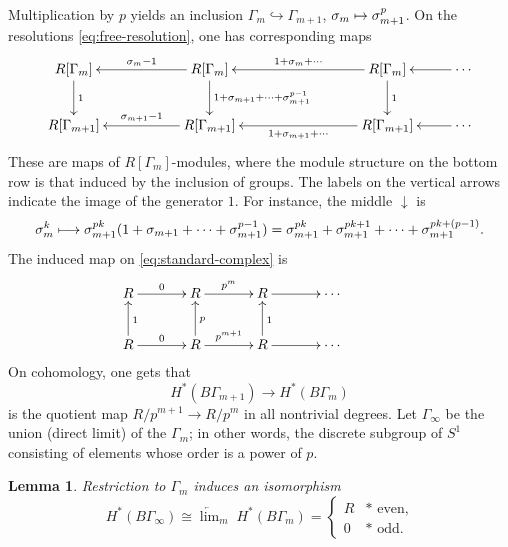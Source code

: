 \documentclass[10pt,a4paper]{amsart}
\newcommand\mto{\mathchoice{\longmapsto}{\mapsto}{\mapsto}{\mapsto}}
\theoremstyle{plain}
\newtheorem{lemma}[theorem]{Lemma}
\theoremstyle{definition}
\let\iso\cong
\begin{document}
Multiplication by $p$ yields an inclusion $\Gamma_m \hookrightarrow \Gamma_{m+1}$, $\sigma_m \mto \sigma_{m+1}^p$. On the resolutions \eqref{eq:free-resolution}, one has corresponding maps
\begin{equation} \label{eq:map-of-resolutions}
\begin{array}{c}
\xymatrix{
R[\Gamma_m] \ar[d]^-{1}
&&
R[\Gamma_m] \ar[ll]_-{\sigma_m-1} \ar[d]^-{1+\sigma_{m+1}+\cdots+\sigma_{m+1}^{p-1}}
&&&
R[\Gamma_m] \ar[lll]_-{1+\sigma_m+\cdots} \ar[d]^-{1} & \ar[l] \cdots
\\
R[\Gamma_{m+1}]
&&
\ar[ll]_-{\sigma_{m+1}-1}
R[\Gamma_{m+1}]
&&&
\ar[lll]^-{1+\sigma_{m+1}+\cdots}
R[\Gamma_{m+1}] & \ar[l] \cdots
}
\end{array}
\end{equation}
These are maps of $R[\Gamma_m]$-modules, where the module structure on the bottom row is that induced by the inclusion of groups. The labels on the vertical arrows indicate the image of the generator $1$. For instance, the middle $\downarrow$ is
\begin{equation*}
\sigma_m^k \mto \sigma_{m+1}^{pk}(1 + \sigma_{m+1} + \cdots + \sigma_{m+1}^{p-1}) =
\sigma_{m+1}^{pk} + \sigma_{m+1}^{pk+1} + \cdots +
\sigma_{m+1}^{pk+(p-1)}.
\end{equation*}
The induced map on \eqref{eq:standard-complex} is
\begin{equation} \label{eq:induced-map}
\begin{array}{c}
\xymatrix@C=1.2cm{
R \ar[r]^-0 &
R \ar[r]^-{p^m} &
R \ar[r] & \cdots
&
\\
R \ar[r]^-0 \ar[u]_1 &
R \ar[r]^-{p^{m+1}} \ar[u]_p &
R \ar[u]_1 \ar[r] & \cdots
}
\end{array}
\end{equation}
On cohomology, one gets that
\begin{equation*}
H^*(B\Gamma_{m+1}) \to H^*(B\Gamma_m)
\end{equation*}
is the quotient map $R/p^{m+1} \to R/p^m$ in all nontrivial degrees. Let $\Gamma_\infty$ be the union (direct limit) of the $\Gamma_m$; in other words, the discrete subgroup of $S^1$ consisting of elements whose order is a power of $p$.

\begin{lemma} \label{th:gamma-infinity}
Restriction to $\Gamma_m$ induces an isomorphism
\begin{equation*}
H^*(B\Gamma_\infty) \iso \underleftarrow{\lim}_m \; H^*(B\Gamma_m) = \begin{cases}
R & \ast \text{ even,} \\
0 & \ast \text{ odd.}
\end{cases}
\end{equation*}
\end{lemma}
\end{document}
